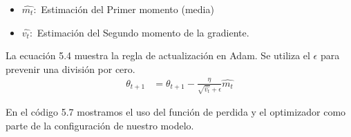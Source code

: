 \begin{itemize}
	\item $\hat{m_{t}}:$ Estimación del Primer momento (media)
	\item $\hat{v_{t}}:$ Estimación del Segundo momento de la gradiente.
\end{itemize}

La ecuación 5.4 muestra la regla de actualización en Adam. Se utiliza el $\epsilon$ para prevenir una división por cero.
\begin{equation}
\label{adam3}
\begin{aligned}
\theta_{t+1}&= \theta_{t+1} - \frac{\eta}{\sqrt{\hat{v_{t}}}+\epsilon} \hat{m_{t}}	
\end{aligned}
\end{equation}

En el código 5.7 mostramos el uso del función de perdida y el optimizador como parte de la configuración de nuestro modelo.
